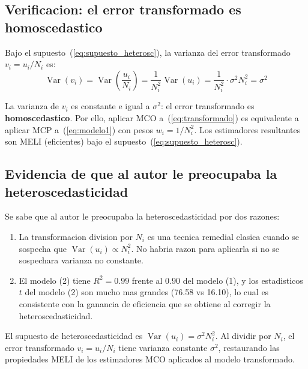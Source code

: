 \documentclass[12pt, letterpaper]{article}
\theoremstyle{remark}
\newcommand{\Var}{\operatorname{Var}}
\begin{document}
\subsection{Verificacion: el error transformado es homoscedastico}

Bajo el supuesto~(\ref{eq:supuesto_heterosc}), la varianza del error transformado
$v_i = u_i/N_i$ es:
\begin{equation}
  \Var(v_i) = \Var\left(\frac{u_i}{N_i}\right)
            = \frac{1}{N_i^2}\Var(u_i)
            = \frac{1}{N_i^2} \cdot \sigma^2 N_i^2
            = \sigma^2
  \label{eq:homosc_vi}
\end{equation}

La varianza de $v_i$ es constante e igual a $\sigma^2$: el error transformado
es \textbf{homoscedastico}. Por ello, aplicar MCO a~(\ref{eq:transformado}) es
equivalente a aplicar MCP a~(\ref{eq:modelo1}) con pesos $w_i = 1/N_i^2$.
Los estimadores resultantes son MELI (eficientes) bajo el supuesto~(\ref{eq:supuesto_heterosc}).

\subsection{Evidencia de que al autor le preocupaba la heteroscedasticidad}

Se sabe que al autor le preocupaba la heteroscedasticidad por dos razones:

\begin{enumerate}[leftmargin=1.8em, itemsep=4pt]
  \item La transformacion division por $N_i$ es una tecnica remedial clasica
    cuando se sospecha que $\Var(u_i) \propto N_i^2$. No habria razon para
    aplicarla si no se sospechara varianza no constante.

  \item El modelo (2) tiene $R^2 = 0.99$ frente al $0.90$ del modelo (1),
    y los estadisticos $t$ del modelo (2) son mucho mas grandes (76.58 vs 16.10),
    lo cual es consistente con la ganancia de eficiencia que se obtiene al
    corregir la heteroscedasticidad.
\end{enumerate}

\begin{clave}
  El supuesto de heteroscedasticidad es $\Var(u_i) = \sigma^2 N_i^2$. Al dividir
  por $N_i$, el error transformado $v_i = u_i/N_i$ tiene varianza constante
  $\sigma^2$, restaurando las propiedades MELI de los estimadores MCO aplicados
  al modelo transformado.
\end{clave}
\end{document}
